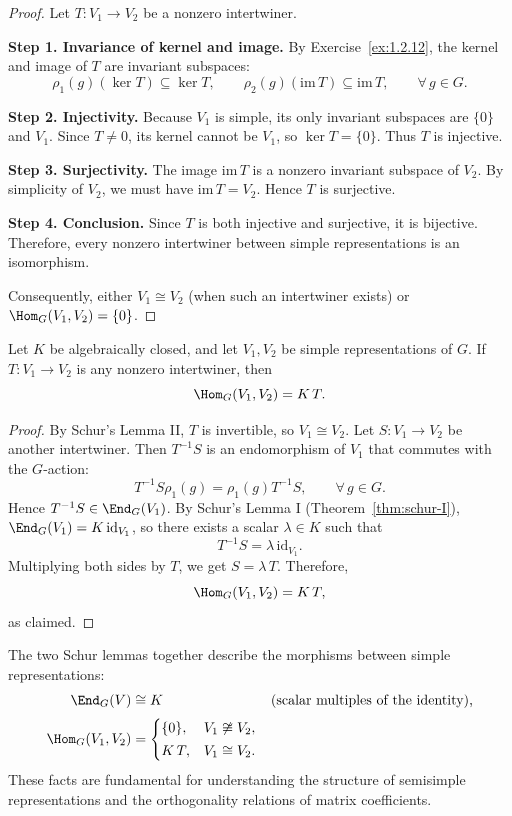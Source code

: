 \begin{proof}
Let $T:V_1\to V_2$ be a nonzero intertwiner.

\smallskip
\noindent\textbf{Step 1. Invariance of kernel and image.}
By Exercise~\ref{ex:1.2.12}, the kernel and image of $T$ are invariant subspaces:
\[
\rho_1(g)(\ker T)\subseteq \ker T, \qquad
\rho_2(g)(\mathrm{im}\,T)\subseteq \mathrm{im}\,T, \qquad \forall\,g\in G.
\]

\smallskip
\noindent\textbf{Step 2. Injectivity.}
Because $V_1$ is simple, its only invariant subspaces are $\{0\}$ and $V_1$.
Since $T\neq 0$, its kernel cannot be $V_1$, so $\ker T=\{0\}$.
Thus $T$ is injective.

\smallskip
\noindent\textbf{Step 3. Surjectivity.}
The image $\mathrm{im}\,T$ is a nonzero invariant subspace of $V_2$.
By simplicity of $V_2$, we must have $\mathrm{im}\,T=V_2$.
Hence $T$ is surjective.

\smallskip
\noindent\textbf{Step 4. Conclusion.}
Since $T$ is both injective and surjective, it is bijective.
Therefore, every nonzero intertwiner between simple representations is an isomorphism.

Consequently, either $V_1\cong V_2$ (when such an intertwiner exists) or $\Hom_G(V_1,V_2)=\{0\}$.
\end{proof}

\begin{corollary}\label{cor:schur-II}
Let $K$ be algebraically closed, and let $V_1,V_2$ be simple representations of $G$.
If $T:V_1\to V_2$ is any nonzero intertwiner, then
\[
\Hom_G(V_1,V_2) = K\,T.
\]
\end{corollary}

\begin{proof}
By Schur’s Lemma II, $T$ is invertible, so $V_1\cong V_2$.
Let $S:V_1\to V_2$ be another intertwiner.
Then $T^{-1}S$ is an endomorphism of $V_1$ that commutes with the $G$-action:
\[
T^{-1}S\rho_1(g) = \rho_1(g)T^{-1}S, \qquad \forall\, g\in G.
\]
Hence $T^{-1}S\in\End_G(V_1)$.
By Schur’s Lemma I (Theorem~\ref{thm:schur-I}), $\End_G(V_1)=K\,\mathrm{id}_{V_1}$,
so there exists a scalar $\lambda\in K$ such that
\[
T^{-1}S = \lambda\,\mathrm{id}_{V_1}.
\]
Multiplying both sides by $T$, we get $S = \lambda\,T$.
Therefore,
\[
\Hom_G(V_1,V_2)=K\,T,
\]
as claimed.
\end{proof}

\begin{remark}
The two Schur lemmas together describe the morphisms between simple representations:
\begin{align*}
\End_G(V) &\cong K &&\text{(scalar multiples of the identity),}\\[2pt]
\Hom_G(V_1,V_2) &=
\begin{cases}
\{0\}, & V_1\not\cong V_2,\\[2pt]
K\,T, & V_1\cong V_2.
\end{cases}
\end{align*}
These facts are fundamental for understanding the structure of semisimple representations
and the orthogonality relations of matrix coefficients.
\end{remark}

